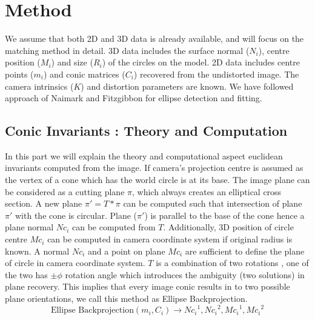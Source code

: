 \documentclass{bmvc2k}
\def\etal{\emph{et al}\bmvaOneDot}
\begin{document}
\section{Method}
We assume that both 2D and 3D data is already available, and will focus on the matching method in detail. 
3D data includes the surface normal ($N_i$), centre position ($M_i$) and size ($R_i$) of the circles on the model. 
2D data includes centre points ($m_i$) and conic matrices ($C_i$) recovered from the undistorted image. The camera intrinsics ($K$) and distortion parameters are known. We have followed approach of Naimark \cite{naimark_circular_2002} and Fitzgibbon \cite{fitzgibbon_direct_1999} for ellipse detection and fitting.  

\subsection{Conic Invariants : Theory and Computation}
In this part we will explain the theory and computational aspect euclidean invariants computed from the image.  
If camera's projection centre is assumed as the vertex of a cone which has the world circle is at its base.
The image plane can be considered as a cutting plane $\pi$, which always creates an elliptical cross section.  
A new plane $ \pi' = T* \pi $ can be computed such that intersection of plane $\pi'$ with the cone is circular. 
Plane ($\pi'$) is parallel to the base of the cone hence a plane normal $Nc_i$ can be computed from $T$. 
Additionally, 3D position of circle centre $Mc_i$ can be computed in camera coordinate system if original radius is known.
A normal $Nc_i$ and a point on plane $Mc_i$ are sufficient to define the plane of circle in camera coordinate system.
$ T $ is a combination of two rotations \cite{forsyth_91}\cite{lo_pez_de_ipin_a_trip:_2002}, one of the two has $\pm \phi$ rotation angle which introduces the ambiguity (two solutions) in plane recovery. 
This implies that every image conic results in to two possible plane orientations, we call this method as Ellipse Backprojection. 
\begin{equation}
\text{Ellipse Backprojection}(m_i,C_i) \rightarrow {Nc_i}^1,{Nc_i}^2,{Mc_i}^1,{Mc_i}^2
\end{equation}
\end{document}

